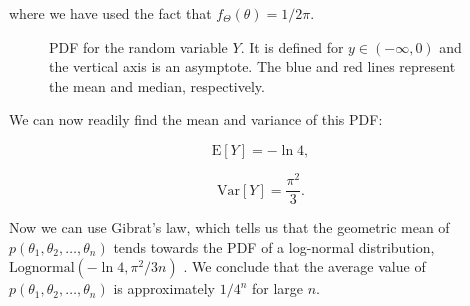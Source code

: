 where we have used the fact that $f_\Theta\left( \theta \right) = 1 / 2\pi$.
\newline

\begin{figure}[ht]
\label{fig:LogCosPDF}
  \centering
  
  \caption{PDF for the random variable $Y$. It is defined for $y \in \left( -\infty, 0 \right)$ and the vertical axis is an asymptote. The blue and red lines represent the mean and median, respectively.}
\end{figure}

We can now readily find the mean and variance of this PDF:

$$\text{E}\left[Y\right] = -\ln 4,$$

$$\text{Var}\left[Y\right] = \frac{\pi^2}{3}.$$

\vspace{0.8em}

Now we can use Gibrat's law, which tells us that the geometric mean of $p\left( \theta_1, \theta_2, \ldots, \theta_n \right)$ tends towards the PDF of a log-normal distribution, $\text{Lognormal} \left( -\ln 4, \pi^2 / 3n \right)$ \cite{Sutton1997} \cite{asymptoticsAndUstats}. We conclude that the average value of $p\left( \theta_1, \theta_2, \ldots, \theta_n \right)$ is approximately $1/4^n$ for large $n$.
